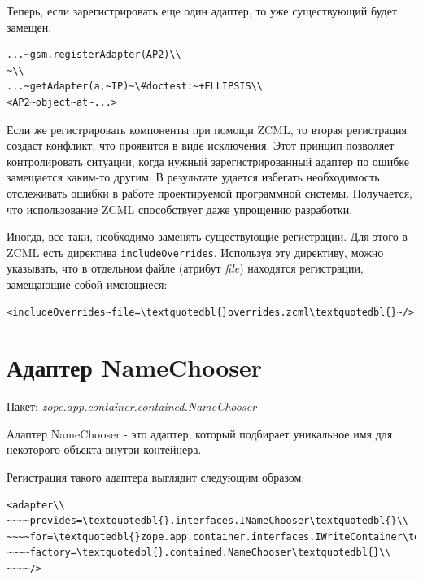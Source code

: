 \documentclass[a4paper,openany,twoside,draft]{book}
\providecommand*{\DUroletitlereference}[1]{\textsl{#1}}
\begin{document}
Теперь, если зарегистрировать еще один адаптер, то уже существующий
будет замещен.

\begin{verbatim}
...~gsm.registerAdapter(AP2)\\
~\\
...~getAdapter(a,~IP)~\#doctest:~+ELLIPSIS\\
<AP2~object~at~...>
\end{verbatim}

Если же регистрировать компоненты при помощи ZCML, то вторая
регистрация создаст конфликт, что проявится в виде исключения.  Этот
принцип позволяет контролировать ситуации, когда нужный
зарегистрированный адаптер по ошибке замещается каким-то другим.  В
результате удается избегать необходимость отслеживать ошибки в работе
проектируемой программной системы.  Получается, что использование ZCML
способствует даже упрощению разработки.

Иногда, все-таки, необходимо заменять существующие регистрации.  Для
этого в ZCML есть директива \texttt{includeOverrides}.  Используя эту
директиву, можно указывать, что в отдельном файле (атрибут \DUroletitlereference{file})
находятся регистрации, замещающие собой имеющиеся:

\begin{verbatim}
<includeOverrides~file=\textquotedbl{}overrides.zcml\textquotedbl{}~/>
\end{verbatim}


\section{Адаптер NameChooser%
  \label{namechooser}%
}

Пакет: \DUroletitlereference{zope.app.container.contained.NameChooser}

Адаптер NameChooser - это адаптер, который подбирает уникальное имя
для некоторого объекта внутри контейнера.

Регистрация такого адаптера выглядит следующим образом:

\begin{verbatim}
<adapter\\
~~~~provides=\textquotedbl{}.interfaces.INameChooser\textquotedbl{}\\
~~~~for=\textquotedbl{}zope.app.container.interfaces.IWriteContainer\textquotedbl{}\\
~~~~factory=\textquotedbl{}.contained.NameChooser\textquotedbl{}\\
~~~~/>
\end{verbatim}
\end{document}

